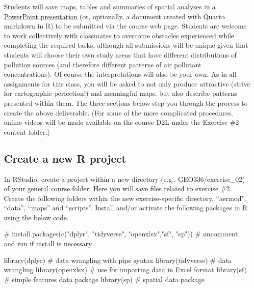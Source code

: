 \documentclass[
  letterpaper,
  DIV=11,
  numbers=noendperiod]{scrartcl}
\newenvironment{Shaded}{\begin{snugshade}}{\end{snugshade}}
\newcommand{\CommentTok}[1]{\textcolor[rgb]{0.37,0.37,0.37}{#1}}
\newcommand{\FunctionTok}[1]{\textcolor[rgb]{0.28,0.35,0.67}{#1}}
\newcommand{\NormalTok}[1]{\textcolor[rgb]{0.00,0.23,0.31}{#1}}
\begin{document}
Students will save maps, tables and summaries of spatial analyses in a
\href{https://github.com/justenvirons/pedagogy/raw/main/GEO346_2022_FallQuarter/Exercise_02/Exercise02_AirDispersion_SlidesTemplate.pptx}{PowerPoint
presentation} (or, optionally, a document created with Quarto markdown
in R) to be submitted via the course web page. Students are welcome to
work collectively with classmates to overcome obstacles experienced
while completing the required tasks, although all submissions will be
unique given that students will choose their own study areas that have
different distributions of pollution sources (and therefore different
patterns of air pollutant concentrations). Of course the interpretations
will also be your own. As in all assignments for this class, you will be
asked to not only produce attractive (strive for cartographic
perfection!) and meaningful maps, but also describe patterns presented
within them. The three sections below step you through the process to
create the above deliverable. (For some of the more complicated
procedures, online videos will be made available on the course D2L under
the Exercise \#2 content folder.)

\hypertarget{create-a-new-r-project}{%
\subsection{Create a new R project}\label{create-a-new-r-project}}

In RStudio, create a project within a new directory (e.g.,
GEO336/exercise\_02) of your general course folder. Here you will save
files related to exercise \#2. Create the following folders within the
new exercise-specific directory, ``aermod'', ``data'', ``maps'' and
``scripts''. Install and/or activate the following packages in R using
the below code.

\begin{Shaded}
\begin{Highlighting}[]
\CommentTok{\# install.packages(c("dplyr", "tidyverse", "openxlsx","sf", "sp")) \# uncomment and run if install is necessary}

\FunctionTok{library}\NormalTok{(dplyr) }\CommentTok{\# data wrangling with pipe syntax}
\FunctionTok{library}\NormalTok{(tidyverse) }\CommentTok{\# data wrangling}
\FunctionTok{library}\NormalTok{(openxlsx) }\CommentTok{\# use for importing data in Excel format}
\FunctionTok{library}\NormalTok{(sf) }\CommentTok{\# simple features data package }
\FunctionTok{library}\NormalTok{(sp) }\CommentTok{\# spatial data package}
\end{Highlighting}
\end{Shaded}
\end{document}
